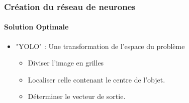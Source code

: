 
\begin{frame}
\frametitle{Création du réseau de neurones}
\framesubtitle{Solution Optimale}


\begin{itemize}
    \item<1->   "YOLO" : Une transformation de l'espace du problème
    \begin{itemize}
        \item<2->   Diviser l'image en grilles
        \item<3->   Localiser celle contenant le centre de l'objet.
        \item<4->   Déterminer le vecteur de sortie.
    \end{itemize}
\end{itemize}


\end{frame}
